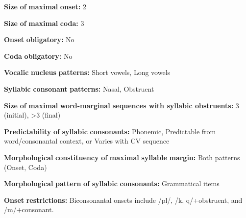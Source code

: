 \begin{styleBody}
\textbf{Size} \textbf{of} \textbf{maximal} \textbf{onset:} 2
\end{styleBody}

\begin{styleBody}
\textbf{Size} \textbf{of} \textbf{maximal} \textbf{coda:} 3
\end{styleBody}

\begin{styleBody}
\textbf{Onset} \textbf{obligatory:} No
\end{styleBody}

\begin{styleBody}
\textbf{Coda} \textbf{obligatory:} No
\end{styleBody}

\begin{styleBody}
\textbf{Vocalic} \textbf{nucleus} \textbf{patterns:} Short vowels, Long vowels
\end{styleBody}

\begin{styleBody}
\textbf{Syllabic} \textbf{consonant} \textbf{patterns:} Nasal, Obstruent
\end{styleBody}

\begin{styleBody}
\textbf{Size} \textbf{of} \textbf{maximal} \textbf{word{}-marginal sequences with syllabic obstruents:} 3 (initial), >3 (final)
\end{styleBody}

\begin{styleBody}
\textbf{Predictability} \textbf{of} \textbf{syllabic} \textbf{consonants:} Phonemic, Predictable from word/consonantal context, or Varies with CV sequence
\end{styleBody}

\begin{styleBody}
\textbf{Morphological} \textbf{constituency} \textbf{of} \textbf{maximal} \textbf{syllable} \textbf{margin:} Both patterns (Onset, Coda)
\end{styleBody}

\begin{styleBody}
\textbf{Morphological} \textbf{pattern} \textbf{of} \textbf{syllabic} \textbf{consonants:} Grammatical items
\end{styleBody}

\begin{styleBody}
\textbf{Onset} \textbf{restrictions:} Biconsonantal onsets include /pl/, /k, q/+obstruent, and /m/+consonant.
\end{styleBody}


